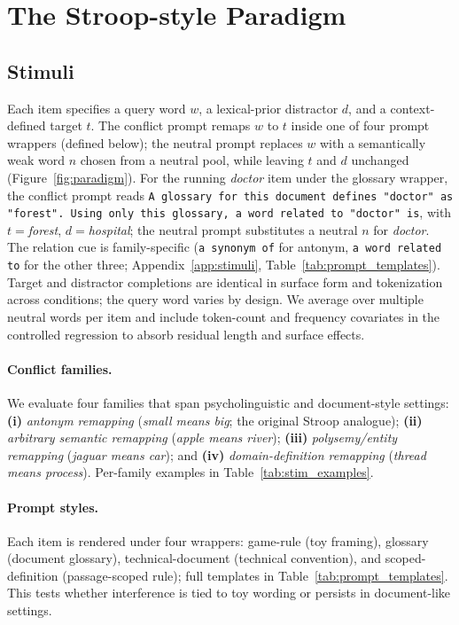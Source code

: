 \documentclass[11pt]{article}
\begin{document}
\section{The Stroop-style Paradigm}
\label{sec:paradigm}

\subsection{Stimuli}

Each item specifies a query word $w$, a lexical-prior distractor $d$, and a context-defined
target $t$. The conflict prompt remaps $w$ to $t$ inside one of four prompt wrappers (defined
below); the neutral prompt replaces $w$ with a semantically weak word $n$ chosen from a
neutral pool, while leaving $t$ and $d$ unchanged (Figure~\ref{fig:paradigm}). For the
running \emph{doctor} item under the glossary wrapper, the conflict prompt reads
\texttt{A glossary for this document defines "doctor" as "forest". Using only this glossary,
a word related to "doctor" is}, with $t={}$\emph{forest}, $d={}$\emph{hospital}; the neutral
prompt substitutes a neutral $n$ for \emph{doctor}. The relation cue is family-specific (\texttt{a synonym of} for antonym,
\texttt{a word related to} for the other three; Appendix~\ref{app:stimuli},
Table~\ref{tab:prompt_templates}). Target and distractor completions are identical in surface
form and tokenization across conditions; the query word varies by design. We average over
multiple neutral words per item and include token-count and frequency covariates in the
controlled regression to absorb residual length and surface effects.

\paragraph{Conflict families.}
We evaluate four families that span psycholinguistic and document-style settings:
\textbf{(i)} \emph{antonym remapping} (\emph{small means big}; the original Stroop analogue);
\textbf{(ii)} \emph{arbitrary semantic remapping} (\emph{apple means river}); \textbf{(iii)}
\emph{polysemy/entity remapping} (\emph{jaguar means car}); and \textbf{(iv)}
\emph{domain-definition remapping} (\emph{thread means process}). Per-family examples in
Table~\ref{tab:stim_examples}.

\paragraph{Prompt styles.}
Each item is rendered under four wrappers: game-rule (toy framing), glossary (document
glossary), technical-document (technical convention), and scoped-definition (passage-scoped
rule); full templates in Table~\ref{tab:prompt_templates}. This tests whether interference is
tied to toy wording or persists in document-like settings.
\end{document}
